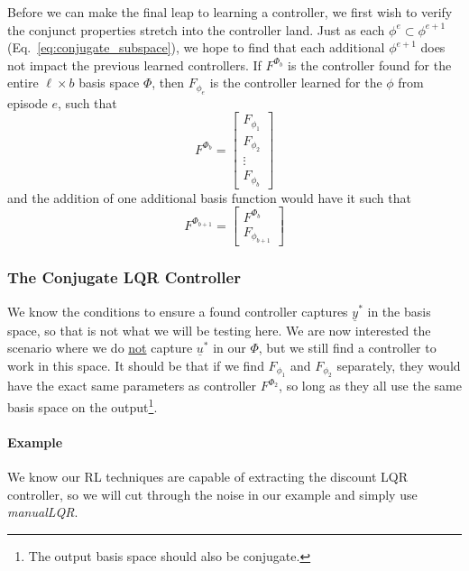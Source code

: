 Before we can make the final leap to learning a controller, we first wish to verify the conjunct properties stretch into the controller land. Just as each $\phi^{e} \subset \phi^{e+1}$ (Eq.~\ref{eq:conjugate_subspace}), we hope to find that each additional $\phi^{e+1}$ does not impact the previous learned controllers. If $F^{\Phi_b}$ is the controller found for the entire $\ell \times b$ basis space $\Phi$, then $F_{\phi_e}$ is the controller learned for the $\phi$ from episode $e$, such that
\begin{equation}
    F^{\Phi_b} = \begin{bmatrix}
        F_{\phi_1} \\ F_{\phi_2} \\ \vdots \\ F_{\phi_b}
    \end{bmatrix}
\end{equation}
and the addition of one additional basis function would have it such that
\begin{equation}
    F^{\Phi_{b+1}} = \begin{bmatrix}
        F^{\Phi_b} \\ F_{\phi_{b+1}}
    \end{bmatrix}
\end{equation}

\FloatBarrier\subsubsection{The Conjugate LQR Controller}
We know the conditions to ensure a found controller captures $\underline{y}^\ast$ in the basis space, so that is not what we will be testing here. We are now interested the scenario where we do \underline{not} capture $\underline{u}^\ast$ in our $\Phi$, but we still find a controller to work in this space. It should be that if we find $F_{\phi_1}$ and $F_{\phi_2}$ separately, they would have the exact same parameters as controller $F^{\Phi_2}$, so long as they all use the same basis space on the output\footnote{The output basis space should also be conjugate.}.

\FloatBarrier\paragraph{Example }
We know our RL techniques are capable of extracting the discount LQR controller, so we will cut through the noise in our example and simply use \textit{manualLQR}. 

